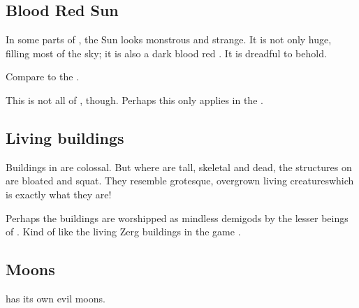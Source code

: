 \subsection{Blood Red Sun}
In some parts of \Machai, the Sun looks monstrous and strange. 
It is not only huge, filling most of the sky; it is also a dark blood red \colour. It is dreadful to behold. 

Compare to the . 

This is not all of \Machai, though. Perhaps this only applies in the . 









\subsection{Living buildings}
Buildings in \Machai{} are colossal. But where  are tall, skeletal and dead, the structures on \Machai{} are bloated and squat. They resemble grotesque, overgrown living creatures\dash which is exactly what they are!

Perhaps the buildings are worshipped as mindless demigods by the lesser beings of \Machai. Kind of like the living Zerg buildings in the game \cite{VideoGame:Starcraft}. 










\subsection{Moons}
\Machai{} has its own evil moons.










